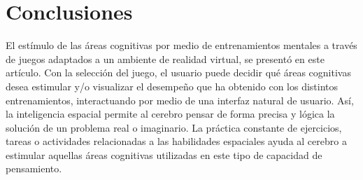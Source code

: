 \documentclass[conference]{IEEEtran}
\begin{document}
%






\section{Conclusiones} \label{conclusiones}
El estímulo de las áreas cognitivas por medio de entrenamientos mentales a través de juegos adaptados a un ambiente de realidad virtual, se presentó en este artículo. Con la selección del juego, el usuario puede decidir qué áreas cognitivas desea estimular y/o visualizar el desempeño que ha obtenido con los distintos entrenamientos, interactuando por medio de una interfaz natural de usuario. Así, la inteligencia espacial permite al cerebro pensar de forma precisa y lógica la solución de un problema real o imaginario. La práctica constante de ejercicios, tareas o actividades relacionadas a las habilidades espaciales ayuda al cerebro a estimular aquellas áreas cognitivas utilizadas en este tipo de capacidad de pensamiento. 
\end{document}
